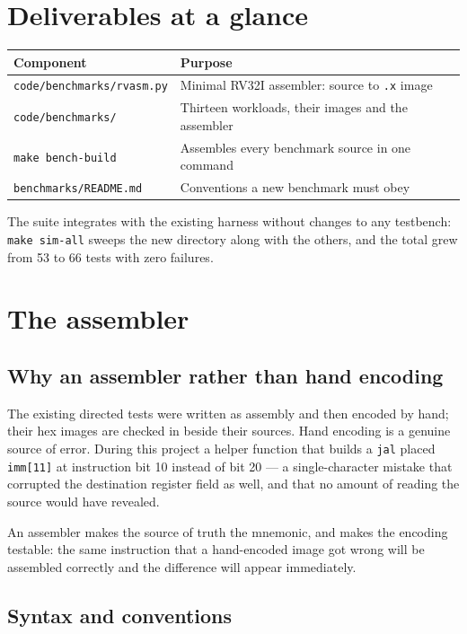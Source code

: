 \documentclass[11pt]{article}
\begin{document}
\section{Deliverables at a glance}

\begin{center}
\begin{tabular}{ll}
\hline
Component & Purpose \\
\hline
\texttt{code/benchmarks/rvasm.py} & Minimal RV32I assembler: source to \texttt{.x} image \\
\texttt{code/benchmarks/} & Thirteen workloads, their images and the assembler \\
\texttt{make bench-build} & Assembles every benchmark source in one command \\
\texttt{benchmarks/README.md} & Conventions a new benchmark must obey \\
\hline
\end{tabular}
\end{center}

The suite integrates with the existing harness without changes to any testbench:
\texttt{make sim-all} sweeps the new directory along with the others, and the total
grew from 53 to 66 tests with zero failures.

\section{The assembler}

\subsection{Why an assembler rather than hand encoding}

The existing directed tests were written as assembly and then encoded by hand; their
hex images are checked in beside their sources. Hand encoding is a genuine source of
error. During this project a helper function that builds a \texttt{jal} placed
\texttt{imm[11]} at instruction bit 10 instead of bit 20 --- a single-character mistake
that corrupted the destination register field as well, and that no amount of reading the
source would have revealed.

An assembler makes the source of truth the mnemonic, and makes the encoding testable:
the same instruction that a hand-encoded image got wrong will be assembled correctly and
the difference will appear immediately.

\subsection{Syntax and conventions}
\end{document}
